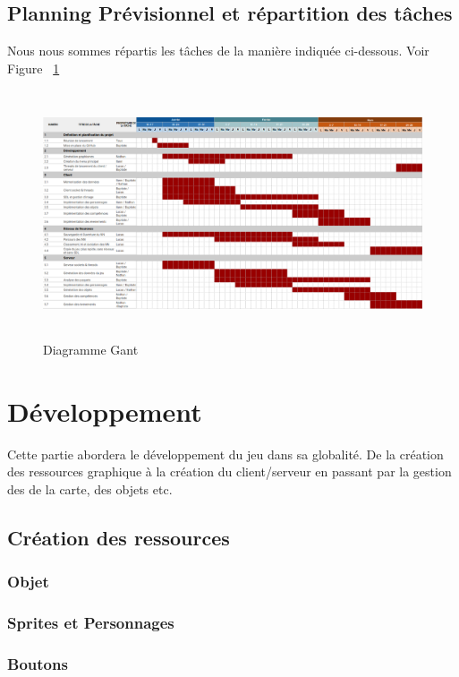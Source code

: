 \documentclass[11pt]{article}
\begin{document}
        \subsection{Planning Prévisionnel et répartition des tâches}
        Nous nous sommes répartis les tâches de la manière indiquée ci-dessous. Voir Figure ~\ref{fig:Gant}
        \begin{center}
            \begin{figure}[H]
                \includegraphics[height=7.3cm]{gant.png}
                \caption{Diagramme Gant}
                \label{fig:Gant}
            \end{figure}
        \end{center}
    \section{Développement}
    Cette partie abordera le développement du jeu dans sa globalité. De la création des ressources graphique à la création du client/serveur en passant par la gestion des de la carte, des objets etc. 
        \subsection{Création des ressources}
            \subsubsection{Objet}
            \subsubsection{Sprites et Personnages}
            \subsubsection{Boutons}
\end{document}
